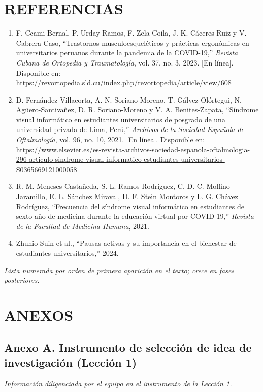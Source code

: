 \documentclass[12pt,letterpaper]{article}
\newcommand{\notafase}[1]{\begin{center}\itshape\small #1\end{center}}
\begin{document}
\section*{\centering REFERENCIAS}

\begin{enumerate}[leftmargin=1.8em,label=\lbrack\arabic*\rbrack,itemsep=0.6em]
\item F. Ccami-Bernal, P. Urday-Ramos, F. Zela-Coila, J. K. Cáceres-Ruiz y V. Cabrera-Caso, ``Trastornos musculoesqueléticos y prácticas ergonómicas en universitarios peruanos durante la pandemia de la COVID-19,'' \emph{Revista Cubana de Ortopedia y Traumatología}, vol. 37, no. 3, 2023. [En línea]. Disponible en: \url{https://revortopedia.sld.cu/index.php/revortopedia/article/view/608}

\item D. Fernández-Villacorta, A. N. Soriano-Moreno, T. Gálvez-Olórtegui, N. Agüero-Santivañez, D. R. Soriano-Moreno y V. A. Benites-Zapata, ``Síndrome visual informático en estudiantes universitarios de posgrado de una universidad privada de Lima, Perú,'' \emph{Archivos de la Sociedad Española de Oftalmología}, vol. 96, no. 10, 2021. [En línea]. Disponible en: \url{https://www.elsevier.es/es-revista-archivos-sociedad-espanola-oftalmologia-296-articulo-sindrome-visual-informatico-estudiantes-universitarios-S0365669121000058}

\item R. M. Meneses Castañeda, S. L. Ramos Rodríguez, C. D. C. Molfino Jaramillo, E. L. Sánchez Miraval, D. F. Stein Montoros y L. G. Chávez Rodríguez, ``Frecuencia del síndrome visual informático en estudiantes de sexto año de medicina durante la educación virtual por COVID-19,'' \emph{Revista de la Facultad de Medicina Humana}, 2021.

\item Zhunio Suin et al., ``Pausas activas y su importancia en el bienestar de estudiantes universitarios,'' 2024.
\end{enumerate}

\notafase{Lista numerada por orden de primera aparición en el texto; crece en fases posteriores.}

\newpage
\section*{\centering ANEXOS}

\subsection*{Anexo A. Instrumento de selección de idea de investigación (Lección 1)}
\notafase{Información diligenciada por el equipo en el instrumento de la Lección 1.}
\end{document}
